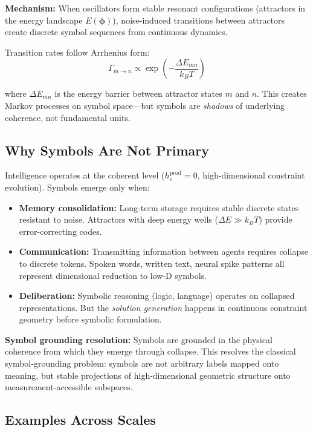 \documentclass[12pt]{article}
\begin{document}
\textbf{Mechanism:} When oscillators form stable resonant configurations (attractors in the energy landscape $E(\boldsymbol{\phi})$), noise-induced transitions between attractors create discrete symbol sequences from continuous dynamics.

Transition rates follow Arrhenius form:
\begin{equation}
\Gamma_{m \to n} \propto \exp\left(-\frac{\Delta E_{mn}}{k_B T}\right)
\end{equation}

where $\Delta E_{mn}$ is the energy barrier between attractor states $m$ and $n$. This creates Markov processes on symbol space---but symbols are \textit{shadows} of underlying coherence, not fundamental units.

\subsection{Why Symbols Are Not Primary}

Intelligence operates at the coherent level ($h_\varepsilon^{\text{prod}} = 0$, high-dimensional constraint evolution). Symbols emerge only when:

\begin{itemize}
\item \textbf{Memory consolidation:} Long-term storage requires stable discrete states resistant to noise. Attractors with deep energy wells ($\Delta E \gg k_B T$) provide error-correcting codes.

\item \textbf{Communication:} Transmitting information between agents requires collapse to discrete tokens. Spoken words, written text, neural spike patterns all represent dimensional reduction to low-D symbols.

\item \textbf{Deliberation:} Symbolic reasoning (logic, language) operates on collapsed representations. But the \textit{solution generation} happens in continuous constraint geometry before symbolic formulation.
\end{itemize}

\textbf{Symbol grounding resolution:} Symbols are grounded in the physical coherence from which they emerge through collapse. This resolves the classical symbol-grounding problem: symbols are not arbitrary labels mapped onto meaning, but stable projections of high-dimensional geometric structure onto measurement-accessible subspaces.

\subsection{Examples Across Scales}
\end{document}
